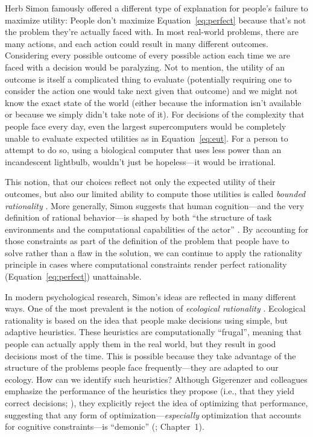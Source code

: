Herb Simon \citeyearpar{simon1955behavioral} famously offered a different type of explanation for people's failure to maximize utility: People don't maximize Equation~\ref{eq:perfect} because that's not the problem they're actually faced with. In most real-world problems, there are many actions, and each action could result in many different outcomes. Considering every possible outcome of every possible action each time we are faced with a decision would be paralyzing. Not to mention, the utility of an outcome is itself a complicated thing to evaluate (potentially requiring one to consider the action one would take next given that outcome) and we might not know the exact state of the world (either because the information isn't available or because we simply didn't take note of it). For decisions of the complexity that people face every day, even the largest supercomputers would be completely unable to evaluate expected utilities as in Equation~\ref{eq:eut}. For a person to attempt to do so, using a biological computer that uses less power than an incandescent lightbulb, wouldn't just be hopeless---it would be irrational. 

This notion, that our choices reflect not only the expected utility of their outcomes, but also our limited ability to compute those utilities is called \emph{bounded rationality} \citep{simon1990bounded}. More generally, Simon suggests that human cognition---and the very definition of rational behavior---is shaped by  both ``the structure of task environments and the computational capabilities of the actor'' \citep{simon1990invariants}. By accounting for those constraints as part of the definition of the problem that people have to solve rather than a flaw in the solution, we can continue to apply the rationality principle in cases where computational constraints render perfect rationality (Equation~\ref{eq:perfect}) unattainable.

In modern psychological research, Simon's ideas are reflected in many different ways. One of the most prevalent is the notion of \emph{ecological rationality} \citep{gigerenzer1999simple,goldstein2002models,todd2012ecological}. Ecological rationality is based on the idea that people make decisions using simple, but adaptive heuristics. These heuristics are computationally ``frugal'', meaning that people can actually apply them in the real world, but they result in good decisions most of the time. This is possible because they take advantage of the structure of the problems people face frequently---they are adapted to our ecology. How can we identify such heuristics? Although Gigerenzer and colleagues emphasize the performance of the heuristics they propose (i.e., that they yield correct decisions; \citealp{goldstein2002models}), they explicitly reject the idea of optimizing that performance, suggesting that any form of optimization---\emph{especially} optimization that accounts for cognitive constraints---is ``demonic'' (\citealp{gigerenzer1999simple}; Chapter~1).

